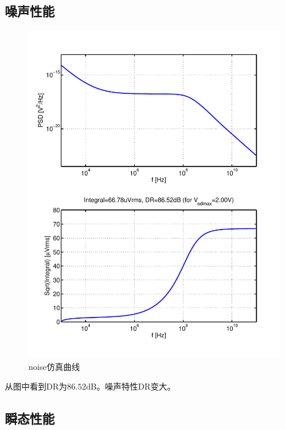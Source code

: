 \documentclass[a4paper]{article}
\newcommand{\udB}{\si{\deci\bel}}
\begin{document}
\subsection{噪声性能}
\begin{figure}[htb]
    \begin{center}
        \includegraphics[width=\textwidth]{fast/noise.pdf}
    \end{center}
    \caption{noise仿真曲线}
    \label{fastnoise}
\end{figure}
从图中看到DR为$86.52\udB$。噪声特性DR变大。
\newpage
\subsection{瞬态性能}
\end{document}
